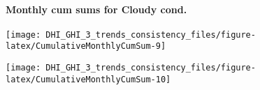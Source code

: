 \documentclass[
  10pt,
  a4paper,oneside]{article}
\begin{document}
\hypertarget{monthly-cum-sums-for-cloudy-cond.}{%
\paragraph{Monthly cum sums for Cloudy cond.}\label{monthly-cum-sums-for-cloudy-cond.}}

\begin{center}\texttt{[image: DHI\_GHI\_3\_trends\_consistency\_files/figure-latex/CumulativeMonthlyCumSum-9]} \end{center}

\begin{center}\texttt{[image: DHI\_GHI\_3\_trends\_consistency\_files/figure-latex/CumulativeMonthlyCumSum-10]} \end{center}

\newpage

\footnotesize
\end{document}
